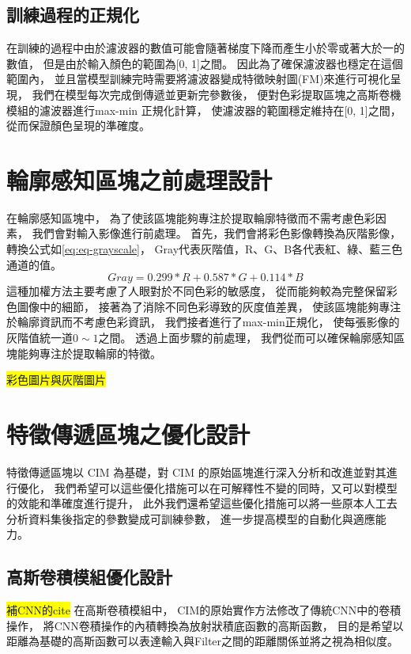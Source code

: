 \documentclass[class=NCU_thesis, crop=false]{standalone}
\begin{document}
	\subsection{訓練過程的正規化}
	在訓練的過程中由於濾波器的數值可能會隨著梯度下降而產生小於零或著大於一的數值，
	但是由於輸入顏色的範圍為[0, 1]之間。
	因此為了確保濾波器也穩定在這個範圍內，
	並且當模型訓練完時需要將濾波器變成特徵映射圖(FM)來進行可視化呈現，
	我們在模型每次完成倒傳遞並更新完參數後，
	便對色彩提取區塊之高斯卷機模組的濾波器進行max-min 正規化計算，
	使濾波器的範圍穩定維持在[0, 1]之間，
	從而保證顏色呈現的準確度。
\pagebreak
\section{輪廓感知區塊之前處理設計}
在輪廓感知區塊中，
為了使該區塊能夠專注於提取輪廓特徵而不需考慮色彩因素，
我們會對輸入影像進行前處理。
首先，我們會將彩色影像轉換為灰階影像，
轉換公式如\cref{eq:eq-grayscale}，
Gray代表灰階值，R、G、B各代表紅、綠、藍三色通道的值。
\begin{equation}
    \label{eq:eq-grayscale}
    Gray = 0.299 * R + 0.587 * G + 0.114 * B
\end{equation}
這種加權方法主要考慮了人眼對於不同色彩的敏感度，
從而能夠較為完整保留彩色圖像中的細節，
接著為了消除不同色彩導致的灰度值差異，
使該區塊能夠專注於輪廓資訊而不考慮色彩資訊，
我們接者進行了max-min正規化，
使每張影像的灰階值統一道$0\sim1$之間。
透過上面步驟的前處理，
我們從而可以確保輪廓感知區塊能夠專注於提取輪廓的特徵。

\colorbox {yellow}{彩色圖片與灰階圖片}

\pagebreak
\section{特徵傳遞區塊之優化設計}
特徵傳遞區塊以 CIM 為基礎，對 CIM 的原始區塊進行深入分析和改進並對其進行優化，
我們希望可以這些優化措施可以在可解釋性不變的同時，又可以對模型的效能和準確度進行提升，
此外我們還希望這些優化措施可以將一些原本人工去分析資料集後指定的參數變成可訓練參數，
進一步提高模型的自動化與適應能力。

	\subsection{高斯卷積模組優化設計}

	\colorbox {yellow}{補CNN的cite}
	在高斯卷積模組中，
	CIM的原始實作方法修改了傳統CNN\cite{}中的卷積操作，
	將CNN卷積操作的內積轉換為放射狀積底函數的高斯函數，
	目的是希望以距離為基礎的高斯函數可以表達輸入與Filter之間的距離關係並將之視為相似度。
\end{document}
